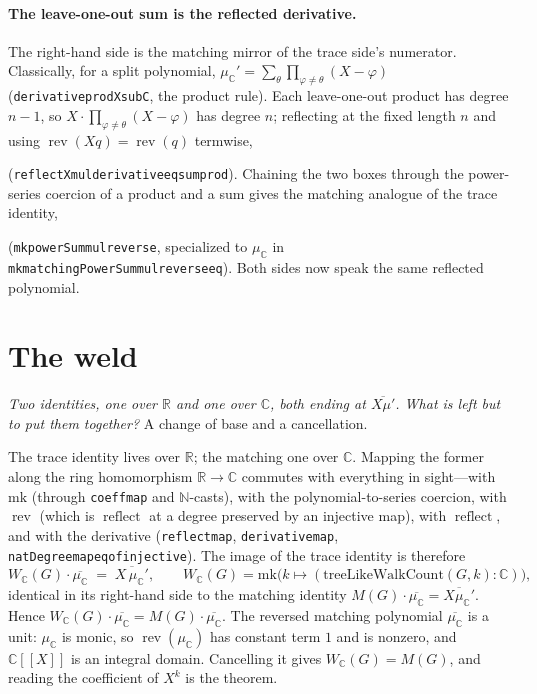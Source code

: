 \documentclass[11pt]{article}
\newcommand{\lean}[1]{{\def\_{\textunderscore\allowbreak}\texttt{#1}}}
\newcommand{\R}{\mathbb{R}}
\newcommand{\C}{\mathbb{C}}
\newcommand{\N}{\mathbb{N}}
\DeclareMathOperator{\reflect}{reflect}
\DeclareMathOperator{\rev}{rev}
\providecommand{\llbracket}{[\![}
\providecommand{\rrbracket}{]\!]}
\newcommand{\keyeq}[1]{\begin{center}\keybox{$\displaystyle #1$}\end{center}}
\begin{document}
\paragraph{The leave-one-out sum is the reflected derivative.} The right-hand side is the matching
mirror of the trace side's numerator. Classically, for a split polynomial,
$\mu_\C'=\sum_\theta\prod_{\varphi\neq\theta}(X-\varphi)$ (\lean{derivative\_prod\_X\_sub\_C}, the
product rule). Each leave-one-out product has degree $n-1$, so $X\cdot\prod_{\varphi\neq\theta}(X-\varphi)$
has degree $n$; reflecting at the fixed length $n$ and using $\rev(Xq)=\rev(q)$ termwise,
\keyeq{\sum_\theta\prod_{\varphi\neq\theta}(1-\varphi X)\;=\;\reflect_n\!\bigl(X\,\mu_\C'\bigr)}
(\lean{reflect\_X\_mul\_derivative\_eq\_sum\_prod}). Chaining the two boxes through the
power-series coercion of a product and a sum gives the matching analogue of the trace identity,
\keyeq{M(G)\cdot\overline{\mu_\C}\;=\;\overline{X\,\mu_\C'}}
(\lean{mk\_powerSum\_mul\_reverse}, specialized to $\mu_\C$ in
\lean{mk\_matchingPowerSum\_mul\_reverse\_eq}). Both sides now speak the same reflected polynomial.

\section{The weld}
\label{sec:weld}

\emph{Two identities, one over $\R$ and one over $\C$, both ending at $\overline{X\mu'}$. What is left
but to put them together?} A change of base and a cancellation.

The trace identity lives over $\R$; the matching one over $\C$. Mapping the former along the ring
homomorphism $\R\to\C$ commutes with everything in sight---with $\mathrm{mk}$ (through
\lean{coeff\_map} and $\N$-casts), with the polynomial-to-series coercion, with $\rev$ (which is
$\reflect$ at a degree preserved by an injective map), with $\reflect$, and with the derivative
(\lean{reflect\_map}, \lean{derivative\_map}, \lean{natDegree\_map\_eq\_of\_injective}). The image of
the trace identity is therefore
\[
  W_\C(G)\cdot\overline{\mu_\C}\;=\;\overline{X\,\mu_\C'},
  \qquad W_\C(G)=\mathrm{mk}\bigl(k\mapsto(\mathrm{treeLikeWalkCount}(G,k):\C)\bigr),
\]
identical in its right-hand side to the matching identity $M(G)\cdot\overline{\mu_\C}=\overline{X\mu_\C'}$.
Hence $W_\C(G)\cdot\overline{\mu_\C}=M(G)\cdot\overline{\mu_\C}$. The reversed matching polynomial
$\overline{\mu_\C}$ is a unit: $\mu_\C$ is monic, so $\rev(\mu_\C)$ has constant term $1$ and is
nonzero, and $\C\llbracket X\rrbracket$ is an integral domain. Cancelling it gives
$W_\C(G)=M(G)$, and reading the coefficient of $X^k$ is the theorem.
\end{document}
